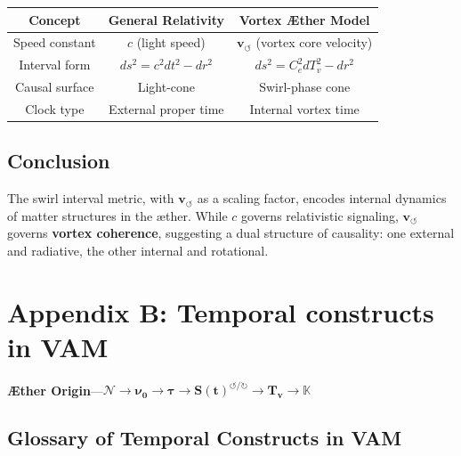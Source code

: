 \documentclass[12pt]{article}
\begin{document}
    \begin{center}
        \begin{tabular}{|c|c|c|}
            \hline
            \textbf{Concept} & \textbf{General Relativity} & \textbf{Vortex Æther Model} \\
            \hline
            Speed constant & \( c \) (light speed) & \( \mathbf{v}_{\scriptscriptstyle\boldsymbol{\circlearrowleft}} \) (vortex core velocity) \\
            \hline
            Interval form & \( ds^2 = c^2 dt^2 - dr^2 \) & \( ds^2 = C_e^2 dT_v^2 - dr^2 \) \\
            \hline
            Causal surface & Light-cone & Swirl-phase cone \\
            \hline
            Clock type & External proper time & Internal vortex time \\
            \hline
        \end{tabular}
    \end{center}

    \subsection*{Conclusion}

    The swirl interval metric, with \( \mathbf{v}_{\scriptscriptstyle\boldsymbol{\circlearrowleft}} \) as a scaling factor, encodes internal dynamics of matter structures in the æther. While \( c \) governs relativistic signaling, \( \mathbf{v}_{\scriptscriptstyle\boldsymbol{\circlearrowleft}} \) governs \textbf{vortex coherence}, suggesting a dual structure of causality: one external and radiative, the other internal and rotational.

\section*{Appendix B: Temporal constructs in VAM}\label{sec:temporal-constructs}
    \textbf{Æther Origin}—\( \boldsymbol{\mathcal{N}} \longrightarrow \boldsymbol{\nu_0} \longrightarrow \boldsymbol{\tau} \longrightarrow \boldsymbol{S(t)^{\bm{\circlearrowleft} / \bm{\circlearrowright}}} \longrightarrow \boldsymbol{T_v} \longrightarrow \boldsymbol{\mathbb{K}} \)
    \subsection*{Glossary of Temporal Constructs in VAM}
\end{document}
